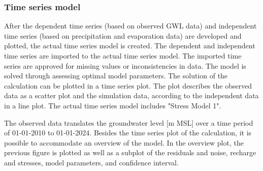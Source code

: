 \subsubsection{Time series model}
After the dependent time series (based on observed GWL data) and independent time series (based on precipitation and evaporation data) are developed and plotted, the actual time series model is created. The dependent and independent time series are imported to the actual time series model. The imported time series are approved for missing values or inconsistencies in data. The model is solved through assessing optimal model parameters. The solution of the calculation can be plotted in a time series plot. The plot describes the observed data as a scatter plot and the simulation data, according to the independent data in a line plot. The actual time series model includes "Stress Model 1".

The observed data translates the groundwater level [m MSL] over a time period of 01-01-2010 to 01-01-2024. Besides the time series plot of the calculation, it is possible to accommodate an overview of the model. In the overview plot, the previous figure is plotted as well as a subplot of the residuals and noise, recharge and stresses, model parameters, and confidence interval. 

